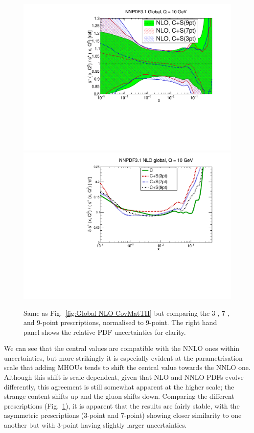\begin{figure}[H]
\begin{center}
   \includegraphics[scale=0.35]{mhous/plots/xsp-Global-NLO-CovMatTH-prescriptions.pdf}
   \includegraphics[scale=0.35]{mhous/plots/xsp-ERR-Global-NLO-CovMatTH-prescriptions-uncertainties.pdf}
   \caption{\small Same as Fig.~\ref{fig:Global-NLO-CovMatTH} but comparing the 3-, 7-, and 9-point prescriptions, normalised
     to 9-point. The right hand panel shows the 
     relative PDF uncertainties for clarity.
    \label{fig:Global-NLO-CovMatTH-prescriptions} }
  \end{center}
\end{figure}
We can see that the central values are compatible with the NNLO ones within uncertainties, but more strikingly it is especially evident at the parametrisation scale that adding MHOUs tends to shift the central value towards the NNLO one. Although this shift is scale dependent, given that NLO and NNLO PDFs evolve differently, this agreement is still somewhat apparent at the higher scale; the strange content shifts up and the gluon shifts down. 
%
Comparing the different prescriptions (Fig.~\ref{fig:Global-NLO-CovMatTH-prescriptions}), it is apparent that the results are fairly stable, with the asymmetric prescriptions (3-point and 7-point) showing closer similarity to one another but with 3-point having slightly larger uncertainties.


